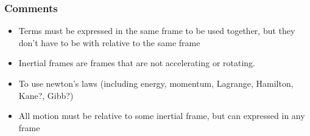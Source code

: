\documentclass[a4paper]{article}
\begin{document}
\subsubsection*{Comments}

\begin{itemize}
    \item Terms must be expressed in the same frame to be used together, but they don't have to be with relative to the same frame
    \item Inertial frames are frames that are not accelerating or rotating.
    \item To use newton's laws (including energy, momentum, Lagrange, Hamilton, Kane?, Gibb?)
    \item All motion must be relative to some inertial frame, but can expressed in any frame
\end{itemize}
\end{document}
